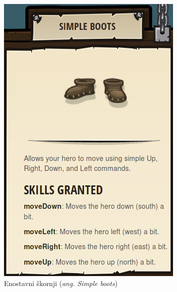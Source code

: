  \begin{figure}[h!]
    \centering
    \begin{subfigure}[]{0.25\textwidth}
      \includegraphics[width=\textwidth]{./images/sc_web/cc_EQ-SB-v01.jpg}
        \caption{Enostavni škornji (\emph{ang. Simple boots})}
        \label{fig:cc:eq:sb}
      \end{subfigure}
      \qquad
    \begin{subfigure}[]{0.25\textwidth}

\end{subfigure}
\end{figure}
